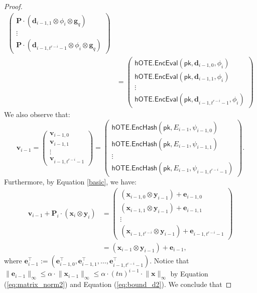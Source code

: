 \documentclass{article}
\newcommand{\BOTE}{\mathsf{hOTE}}
\newcommand{\algofont}[1]{\ensuremath{\mathsf{#1}}}
\newcommand{\Enc}{{\algofont{Enc}}}
\newcommand{\Eval}{\algofont{Eval}\xspace}
\newcommand{\Hash}{{\algofont{Hash}}}
\newcommand{\pk}{{\mathsf{pk}}}
\begin{document}
\begin{proof}
\begin{align*}
\begin{pmatrix}
\mathbf{P}\cdot (\mathbf{d}_{i-1,1}\otimes \phi_i\otimes \mathbf{g}_q)\\
\vdots\\
\mathbf{P}\cdot (\mathbf{d}_{i-1,t^{r-i}-1}\otimes \phi_i\otimes \mathbf{g}_q)
    \end{pmatrix}\\
    &=\begin{pmatrix} \BOTE.\Enc\Eval(\pk, \mathbf{d}_{i-1,0}, \phi_{i})\\
\BOTE.\Enc\Eval(\pk, \mathbf{d}_{i-1,1}, \phi_{i})\\
\vdots\\
\BOTE.\Enc\Eval(\pk, \mathbf{d}_{i-1,t^{r-i}-1}, \phi_{i})
    \end{pmatrix}\end{align*}
We also observe  that:
\[\mathbf{v}_{i-1}=\begin{pmatrix} \mathbf{v}_{i-1,0}\\
\mathbf{v}_{i-1,1}\\
\vdots\\
\mathbf{v}_{i-1,t^{r-i}-1}
    \end{pmatrix}=\begin{pmatrix} \BOTE.\Enc\Hash(\pk, E_{i-1}, \psi_{i-1,0})\\
\BOTE.\Enc\Hash(\pk, E_{i-1}, \psi_{i-1,1})\\
\vdots\\
\BOTE.\Enc\Hash(\pk, E_{i-1}, \psi_{i-1,t^{r-i}-1})
    \end{pmatrix}.\]
Furthermore, by Equation \eqref{basic}, we have:
\begin{align*}
    \mathbf{v}_{i-1}+\mathbf{P}_i\cdot(\mathbf{x}_{i}\otimes \mathbf{y}_i)&=\begin{pmatrix} (\mathbf{x}_{i-1,0}\otimes \mathbf{y}_{i-1})+\mathbf{e}_{i-1,0}\\
(\mathbf{x}_{i-1, 1}\otimes \mathbf{y}_{i-1})+\mathbf{e}_{i-1,1}\\
\vdots\\
(\mathbf{x}_{i-1, t^{r-i}}\otimes \mathbf{y}_{i-1})+\mathbf{e}_{i-1,t^{r-i}-1}
    \end{pmatrix}\\
    &=(\mathbf{x}_{i-1}\otimes \mathbf{y}_{i-1}) +\mathbf{e}_{i-1}, \end{align*}
 where $\mathbf{e}_{i-1}^\intercal:=(\mathbf{e}_{i-1,0}^\intercal, 
\mathbf{e}_{i-1,1}^\intercal, 
\dots, 
\mathbf{e}_{i-1,t^{r-i}-1}^\intercal)$.
Notice that $\lVert \mathbf{e}_{i-1}\rVert_\infty\le \alpha\cdot \lVert \mathbf{x}_{i-1}\rVert_\infty\le \alpha\cdot (tn)^{i-1}\cdot \lVert \mathbf{x}\rVert_\infty$ by Equation (\ref{eq:matrix_norm2}) and Equation (\ref{eq:bound_d2}). We conclude that

\end{proof}
\end{document}
